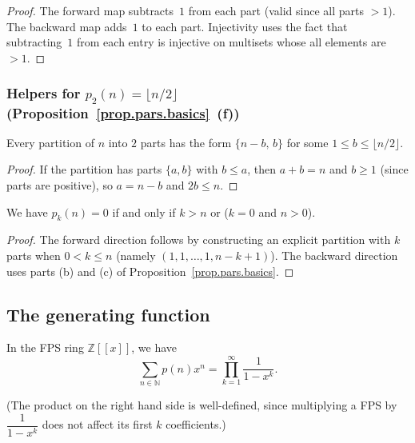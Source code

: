 \begin{proof}
The forward map subtracts~$1$ from each part (valid since all parts $>1$).
The backward map adds~$1$ to each part.
Injectivity uses the fact that subtracting~$1$ from each entry is injective on multisets
whose all elements are $>1$.
\end{proof}

\subsubsection{Helpers for $p_2(n) = \lfloor n/2 \rfloor$ (Proposition~\ref{prop.pars.basics}~(f))}

\begin{lemma}
\label{lem.pars.partition-two-parts-form}
\leanhelper
\leanok
Every partition of $n$ into $2$ parts has the form $\{n-b,\,b\}$ for some
$1\le b \le \lfloor n/2\rfloor$.
\end{lemma}

\begin{proof}
If the partition has parts $\{a, b\}$ with $b\le a$, then $a+b = n$ and $b\ge 1$
(since parts are positive), so $a = n-b$ and $2b\le n$.
\end{proof}

\begin{lemma}
\label{lem.pars.partsCount-eq-zero-iff}
\leanhelper
\leanok
We have $p_k(n) = 0$ if and only if $k > n$ or ($k = 0$ and $n > 0$).
\end{lemma}

\begin{proof}
\leanok
The forward direction follows by constructing an explicit partition with $k$ parts when $0 < k \leq n$
(namely $(1, 1, \ldots, 1, n - k + 1)$). The backward direction uses parts (b) and (c) of
Proposition~\ref{prop.pars.basics}.
\end{proof}

\subsection{The generating function}

\begin{theorem}
\label{thm.pars.main-gf}
\leantarget
\leanok
In the FPS ring $\mathbb{Z}\left[  \left[  x\right]
\right]  $, we have%
\[
\sum_{n\in\mathbb{N}}p\left(  n\right)  x^{n}=\prod_{k=1}^{\infty}\dfrac
{1}{1-x^{k}}.
\]

(The product on the right hand side is well-defined, since multiplying a FPS
by $\dfrac{1}{1-x^{k}}$ does not affect its first $k$ coefficients.)
\end{theorem}

